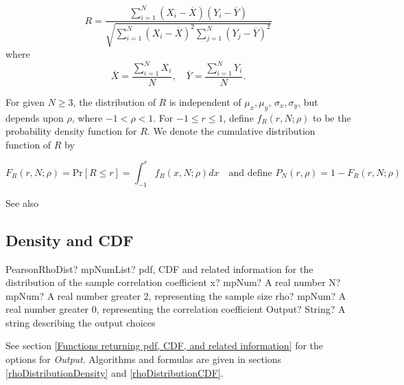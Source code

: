 \begin{equation}
	R = \frac{\sum_{i=1}^{N} (X_i -  \overline{X}) (Y_i -  \overline{Y})}{\sqrt{\sum_{i=1}^{N} (X_i - \overline{X})^2 \sum_{j=1}^{N} (Y_j - \overline{Y})^2}}
\end{equation}
where
\begin{equation}
	\overline{X} = \frac{\sum_{i=1}^{N} X_i}{N}, \quad \overline{Y} = \frac{\sum_{i=1}^{N} Y_i}{N}.
\end{equation}

For given $N \geq 3$, the distribution of $R$ is independent of  $\mu_x, \mu_y$, $\sigma_x, \sigma_y$, but depends upon  $\rho$, where $-1 < \rho < 1$.
For $-1 \leq r \leq 1$, define $f_R(r, N; \rho)$ to be the probability density function for $R$. We denote the cumulative distribution function of $R$ by \citep{odeh_1986}

\begin{equation}
	F_R(r, N; \rho) = \text{Pr}[R \leq r] = \int_{-1}^{r}{f_R(x, N; \rho) dx} \quad \text{and define } P_N(r, \rho) = 1 - F_R(r, N; \rho)
\end{equation}

See also \cite{subrahmaniam_extensions_1983}


%



\subsection{Density and CDF}

\begin{mpFunctionsExtract}
	\mpFunctionFourNotImplemented
	{PearsonRhoDist? mpNumList? pdf, CDF and related information for the distribution of the sample correlation coefficient}
	{x? mpNum? A real number}
	{N? mpNum? A real number greater 2, representing the sample size}
	{rho? mpNum? A real number greater 0, representing the correlation coefficient}
	{Output? String? A string describing the output choices}
\end{mpFunctionsExtract}


\vspace{0.3cm}
See section \ref{Functions returning pdf, CDF, and related information} for the options for {\itshape\sffamily Output}. Algorithms and formulas are given in sections \ref{rhoDistributionDensity} and \ref{rhoDistributionCDF}.

